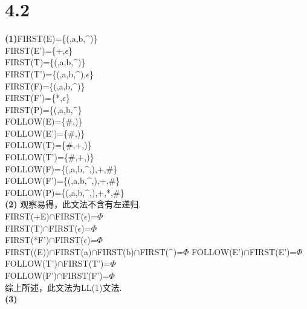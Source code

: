 \documentclass{article}
\begin{document}
\section*{4.2}
\noindent 
\textbf{(1)}FIRST(E)=\{(,a,b,$\^{}$)\}\\
FIRST(E')=\{+,$\epsilon$\}\\
FIRST(T)=\{(,a,b,$\^{}$)\}\\
FIRST(T')=\{(,a,b,$\^{}$),$\epsilon$\}\\
FIRST(F)=\{(,a,b,$\^{}$)\}\\
FIRST(F')=\{*,$\epsilon$\}\\
FIRST(P)=\{(,a,b,$\^{}$\}\\
FOLLOW(E)=\{\#,)\}\\
FOLLOW(E')=\{\#,)\}\\
FOLLOW(T)=\{\#,+,)\}\\
FOLLOW(T')=\{\#,+,)\}\\
FOLLOW(F)=\{(,a,b,$\^{}$,),+,\#\}\\
FOLLOW(F')=\{(,a,b,$\^{}$,),+,\#\}\\
FOLLOW(P)=\{(,a,b,$\^{}$,),+,*,\#\}\\
\textbf{(2)}
观察易得，此文法不含有左递归.\\
FIRST(+E)$\cap$FIRST($\epsilon$)=$\Phi$\\
FIRST(T)$\cap$FIRST($\epsilon$)=$\Phi$\\
FIRST(*F')$\cap$FIRST($\epsilon$)=$\Phi$\\
FIRST((E))$\cap$FIRST(a)$\cap$FIRST(b)$\cap$FIRST($\^{}$)=$\Phi$
FOLLOW(E')$\cap$FIRST(E')=$\Phi$\\
FOLLOW(T')$\cap$FIRST(T')=$\Phi$\\
FOLLOW(F')$\cap$FIRST(F')=$\Phi$\\
综上所述，此文法为LL(1)文法.\\
\textbf{(3)}
\end{document}
